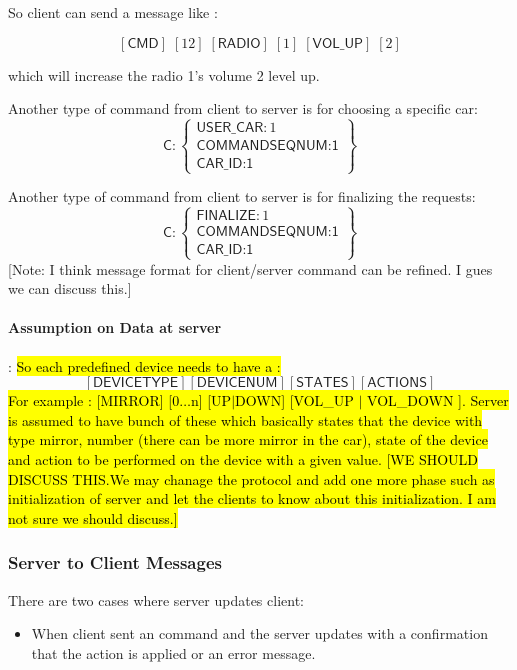 So client can send a message like :

\[ [\textsf{CMD}]\;[12]\;[\textsf{RADIO}]\;[1]\;[\textsf{VOL\_UP}]\;[2]\]

which will increase the radio 1's volume 2 level up.

Another type of command from client to server is for choosing a specific car:
\[
\textsf{C}:\left\{ \begin{array}{ll}  \textsf{USER\_CAR}:1\\
                                      \textsf{COMMANDSEQNUM:1}\\
                                      \textsf{CAR\_ID:1}

           \end{array} \right\}
\]                                        

Another type of command from client to server is for finalizing the requests:
\[
\textsf{C}:\left\{ \begin{array}{ll}  \textsf{FINALIZE}:1\\
                                      \textsf{COMMANDSEQNUM:1}\\
                                      \textsf{CAR\_ID:1}

           \end{array} \right\}

\]
[Note: I think message format for client/server command can be refined. I gues we can discuss this.]


\paragraph{Assumption on Data at server}:  \hl{So each predefined device needs to have a :}
\[  [\textsf{DEVICETYPE}] [\textsf{DEVICENUM}] [\textsf{STATES}] [\textsf{ACTIONS}]\]
\hl{
For example : [MIRROR] [0$\ldots$n] [UP$\mid$DOWN] [VOL\_UP $\mid$ VOL\_DOWN ]. Server is assumed to have bunch of these which basically states that the device with type mirror, number (there can be more mirror in the car), state of the device and action to be performed on the device with a given value. [WE SHOULD DISCUSS THIS.We may chanage the protocol and add one more phase such as  initialization of server and let the clients to know about this initialization. I am not sure we should discuss.]}

\subsubsection{Server to Client Messages}
\label{sec:pdus:pdu:s_to_c}
There are two cases where server updates client:
\begin{itemize}
\item When client sent an command and the server updates with a confirmation that the action is applied or an error message.
  \end{itemize}

